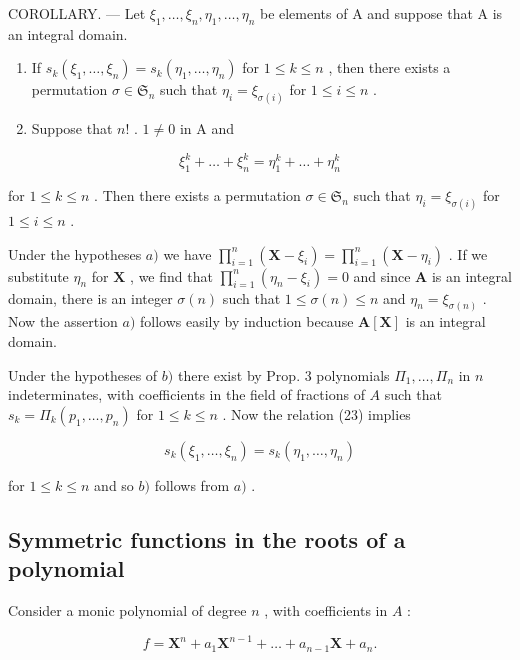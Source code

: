 COROLLARY. --- Let \(\xi_1, \ldots, \xi_n, \eta_1, \ldots, \eta_n\) be elements of A and suppose that A is an integral domain.

\begin{enumerate}
\def\labelenumi{\alph{enumi})}
\item
  If \(s_k(\xi_1, \ldots, \xi_n) = s_k(\eta_1, \ldots, \eta_n)\) for \(1 \leqslant k \leqslant n\) , then there exists a permutation \(\sigma \in \mathfrak{S}_n\) such that \(\eta_i = \xi_{\sigma(i)}\) for \(1 \leqslant i \leqslant n\) .
\item
  Suppose that \(n!\) . \(1 \neq 0\) in A and
\end{enumerate}

\[
\xi_ {1} ^ {k} + \dots + \xi_ {n} ^ {k} = \eta_ {1} ^ {k} + \dots + \eta_ {n} ^ {k}\tag{23}
\]

for \(1 \leqslant k \leqslant n\) . Then there exists a permutation \(\sigma \in \mathfrak{S}_n\) such that \(\eta_i = \xi_{\sigma(i)}\) for \(1 \leqslant i \leqslant n\) .

Under the hypotheses \(a)\) we have \(\prod_{i=1}^{n} (\mathbf{X} - \xi_i) = \prod_{i=1}^{n} (\mathbf{X} - \eta_i)\) . If we substitute \(\eta_n\) for \(\mathbf{X}\) , we find that \(\prod_{i=1}^{n} (\eta_n - \xi_i) = 0\) and since \(\mathbf{A}\) is an integral domain, there is an integer \(\sigma(n)\) such that \(1 \leqslant \sigma(n) \leqslant n\) and \(\eta_n = \xi_{\sigma(n)}\) . Now the assertion \(a)\) follows easily by induction because \(\mathbf{A}[\mathbf{X}]\) is an integral domain.

Under the hypotheses of \(b)\) there exist by Prop. 3 polynomials \(\Pi_1, \ldots, \Pi_n\) in \(n\) indeterminates, with coefficients in the field of fractions of \(A\) such that \(s_k = \Pi_k(p_1, \ldots, p_n)\) for \(1 \leqslant k \leqslant n\) . Now the relation (23) implies

\[
s _ {k} (\xi_ {1}, \dots , \xi_ {n}) = s _ {k} (\eta_ {1}, \dots , \eta_ {n})
\]

for \(1 \leqslant k \leqslant n\) and so \(b)\) follows from \(a)\) .

\subsection{Symmetric functions in the roots of a polynomial}

Consider a monic polynomial of degree \(n\) , with coefficients in \(A\) :

\[
f = \mathbf {X} ^ {n} + a _ {1} \mathbf {X} ^ {n - 1} + \dots + a _ {n - 1} \mathbf {X} + a _ {n}.
\]

